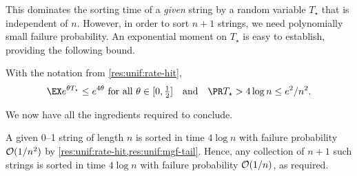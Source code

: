 \documentclass{article}
\begin{document}
This dominates the sorting time of a \emph{given} string by a random variable $T_\star$ that is independent of $n$.
However, in order to sort $n+1$ strings, we need polynomially small failure probability.
An exponential moment on $T_\star$ is easy to establish, providing the following bound.

\begin{lem}
\label{res:unif:mgf-tail}
With the notation from \cref{res:unif:rate-hit},
\[
	\ex{ e^{\theta T_\star} }
\le
	e^{4\theta}
\text{ for all }
	\theta \in [0, \tfrac12]
\Qand
	\pr{ T_\star > 4 \log n }
\le
	e^2 / n^2.
\]
\end{lem}


We now have all the ingredients required to conclude.

\begin{Proof}
A given 0--1 string of length $n$ is sorted in time $4 \log n$ with failure probability $\mathcal{O}( 1/n^2 )$ by \cref{res:unif:rate-hit,res:unif:mgf-tail}.
Hence, any collection of $n+1$ such strings is sorted in time $4 \log n$ with failure probability $\mathcal{O}( 1/n )$,
as required.
\end{Proof}



%
%
\end{document}
